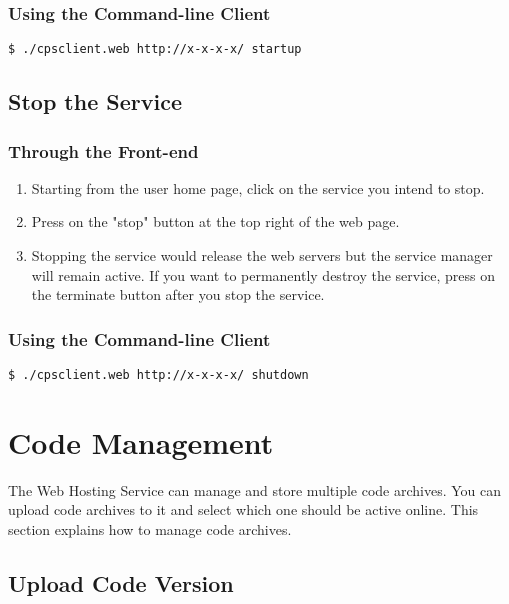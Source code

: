 \documentclass[12pt]{article}
\newenvironment{framedbox}[1]%
{\begin{framed}
 \begingroup
 \fontsize{#1}{#1}\selectfont
}
{
 \endgroup
 \end{framed}
}
\begin{document}
\subsubsection{Using the Command-line Client}
\begin{framedbox}{8pt}\begin{verbatim}
$ ./cpsclient.web http://x-x-x-x/ startup
\end{verbatim}\end{framedbox}


\subsection{Stop the Service}
\subsubsection{Through the Front-end}
\begin{enumerate}
\item Starting from the user home page, click on the service you intend to stop.
\item Press on the "stop" button at the top right of the web page.
\item Stopping the service would release the web servers but the service
      manager will remain active. If you want to permanently destroy the
      service, press on the terminate button after you stop the service.
\end{enumerate}
\subsubsection{Using the Command-line Client}
\begin{framedbox}{8pt}\begin{verbatim}
$ ./cpsclient.web http://x-x-x-x/ shutdown
\end{verbatim}\end{framedbox}

\section{Code Management}
The Web Hosting Service can manage and store multiple code archives. You can
upload code archives to it and select which one should be active online.
This section explains how to manage code archives.

\subsection{Upload Code Version}
\end{document}
